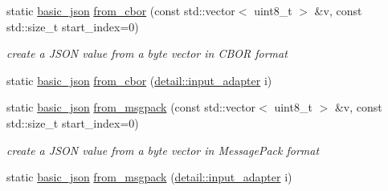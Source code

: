\begin{DoxyCompactItemize}
static \hyperlink{classnlohmann_1_1basic__json}{basic\+\_\+json} \hyperlink{classnlohmann_1_1basic__json_a18efe7af4bc48adb528f68e582e5b0fc}{from\+\_\+cbor} (const std\+::vector$<$ uint8\+\_\+t $>$ \&v, const std\+::size\+\_\+t start\+\_\+index=0)
\begin{DoxyCompactList}\small\item\em create a J\+S\+ON value from a byte vector in C\+B\+OR format \end{DoxyCompactList}\item 
static \hyperlink{classnlohmann_1_1basic__json}{basic\+\_\+json} \hyperlink{classnlohmann_1_1basic__json_aaa0e8aee7e50b6f4f2685f43331fbee5}{from\+\_\+cbor} (\hyperlink{classnlohmann_1_1detail_1_1input__adapter}{detail\+::input\+\_\+adapter} i)
\item 
static \hyperlink{classnlohmann_1_1basic__json}{basic\+\_\+json} \hyperlink{classnlohmann_1_1basic__json_afd0cf197e6e48203d8001679a86d9885}{from\+\_\+msgpack} (const std\+::vector$<$ uint8\+\_\+t $>$ \&v, const std\+::size\+\_\+t start\+\_\+index=0)
\begin{DoxyCompactList}\small\item\em create a J\+S\+ON value from a byte vector in Message\+Pack format \end{DoxyCompactList}\item 
static \hyperlink{classnlohmann_1_1basic__json}{basic\+\_\+json} \hyperlink{classnlohmann_1_1basic__json_a4e318f0a71f3f7c1edb8162723b2911b}{from\+\_\+msgpack} (\hyperlink{classnlohmann_1_1detail_1_1input__adapter}{detail\+::input\+\_\+adapter} i)
\end{DoxyCompactItemize}
